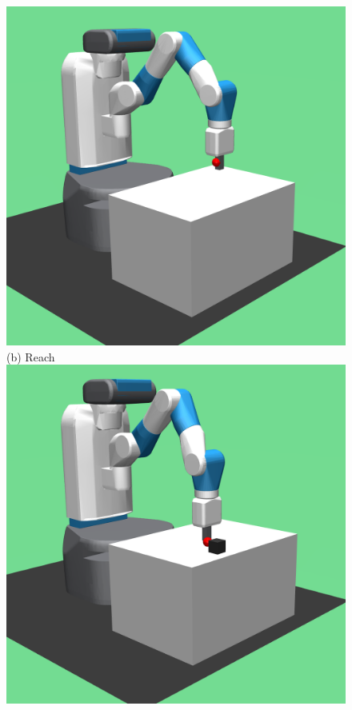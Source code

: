 \begin{figure}[t]
  \includegraphics[width=\linewidth]{figures/chapter3/reach.png}
  ({b}) Reach 
\endminipage\hfill
{}%
  \centering
  \includegraphics[width=\linewidth]{figures/chapter3/push.png}

\end{figure}
